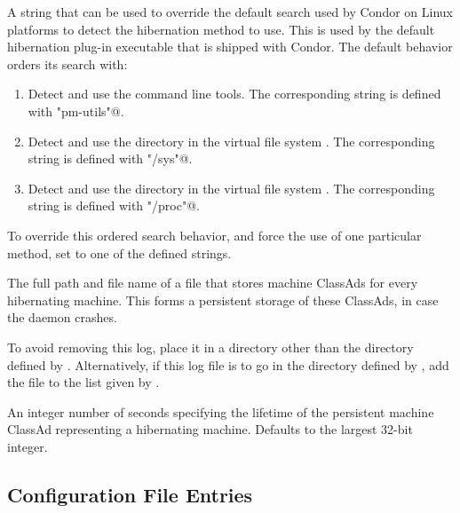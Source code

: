 \begin{description}
\label{param:LinuxHibernationMethod}
\item[\Macro{LINUX\_HIBERNATION\_METHOD}]
  A string that can be used to override the default search used by
  Condor on Linux platforms to detect the hibernation method to use.
  This is used by the default hibernation plug-in executable that is
  shipped with Condor.  The default behavior orders its search with:
  \begin{enumerate}
  \item Detect and use the  command line tools.
    The corresponding string is defined with \verb@"pm-utils"@. 
  \item Detect and use the directory in the virtual file system
    .
    The corresponding string is defined with \verb@"/sys"@.
  \item Detect and use the directory in the virtual file system
    .
    The corresponding string is defined with \verb@"/proc"@.
  \end{enumerate}
  To override this ordered search behavior,
  and force the use of one particular method,
  set  to one of the defined strings.

\label{param:OfflineLog}
\item[\Macro{OFFLINE\_LOG}]
  The full path and file name of a file that stores machine ClassAds 
  for every hibernating machine.  This forms a persistent storage
  of these ClassAds, in case the  daemon crashes.

  To avoid  removing this log, place it in a directory
  other than the directory defined by .  
  Alternatively, if this log file is to go in the 
  directory defined by , add the file to the list
  given by .

\label{param:OfflineExpireAdsAfter}
\item[\Macro{OFFLINE\_EXPIRE\_ADS\_AFTER}]
  An integer number of seconds specifying the lifetime of the
  persistent machine ClassAd representing a hibernating machine.
  Defaults to the largest 32-bit integer.

\end{description}

\subsection{\label{sec:Schedd-Config-File-Entries}
Configuration File Entries}

